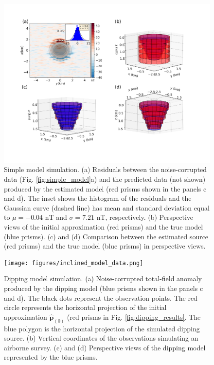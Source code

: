 
\begin{figure}
	\centering
	\includegraphics[width=\linewidth]{figures/simple_results.png}
	\caption{Simple model simulation. (a) Residuals between the  noise-corrupted data (Fig. \ref{fig:simple_model}a) and the predicted data (not shown) produced by the estimated model (red prisms shown in the panels c and d). The inset shows the histogram of the residuals and the Gaussian curve (dashed line) has mean and standard deviation equal to $\mu = -0.04$ nT and $\sigma=7.21$ nT, respectively. (b) Perspective views of the initial approximation (red prisms) and the true model (blue prisms). (c) and (d) Comparison between the estimated source (red prisms) and the true model (blue prisms) in perspective views.}
	\label{fig:simple_results}
\end{figure}


\begin{figure}
    \centering
    \texttt{[image: figures/inclined\_model\_data.png]}
    \caption{Dipping model simulation. (a) Noise-corrupted total-field anomaly produced by the dipping model (blue prisms shown in the panels c and d). The black dots represent the observation points. The red circle represents the horizontal projection 
   	of the initial approximation $\hat{\mathbf{p}}_{(0)}$ 
   	(red prisms in Fig. \ref{fig:dipping_results}. The blue polygon is the horizontal projection of the simulated dipping source.
   	(b) Vertical coordinates of the observations simulating an airborne survey. (c) and (d) Perspective views of the dipping model represented by the blue prisms.
}
    \label{fig:dipping_model}
\end{figure}

